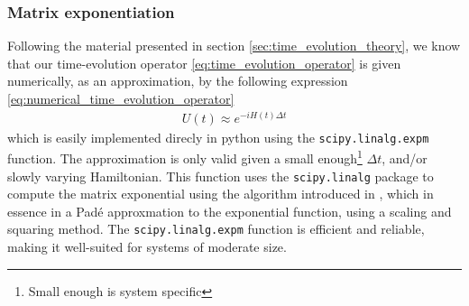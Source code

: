 \documentclass{subfiles}
\begin{document}
\subsubsection{Matrix exponentiation}
Following the material presented in section \ref{sec:time_evolution_theory}, we know that our time-evolution operator \eqref{eq:time_evolution_operator} is given numerically, as an approximation, by the following expression \eqref{eq:numerical_time_evolution_operator}
\begin{align*}
    U(t) \approx e^{-iH(t)\Delta t} 
\end{align*}
which is easily implemented direcly in python using the \texttt{scipy.linalg.expm} function. The approximation is only valid given a small enough\footnote{Small enough is system specific} $\Delta t$, and/or slowly varying Hamiltonian. This function uses the \texttt{scipy.linalg} package to compute the matrix exponential using the algorithm introduced in \cite{Al-Mohy_Higham_2010}, which in essence in a Padé approxmation to the exponential function, using a scaling and squaring method. The \texttt{scipy.linalg.expm} function is efficient and reliable, making it well-suited for systems of moderate size. 
\end{document}
